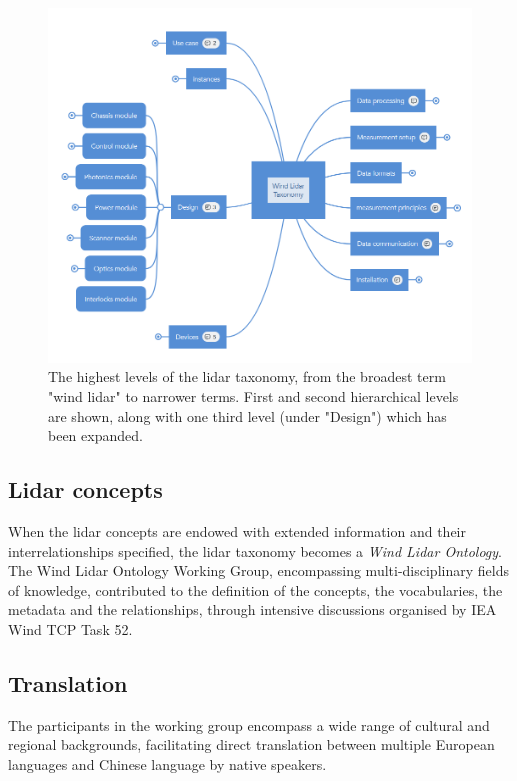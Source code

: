\documentclass[remotesensing,article,submit,pdftex,moreauthors]{Definitions/mdpi}
\begin{document}
\begin{figure}[ht]
    \centering
    \includegraphics[width=\textwidth]{Figures/MindMap.PNG}
    \caption{The highest levels of the lidar taxonomy, from the broadest term "wind lidar" to narrower terms. First and second hierarchical levels are shown, along with one third level (under "Design") which has been expanded.}
    \label{fig:tax}
\end{figure}

\subsection{Lidar concepts}
When the lidar concepts are endowed with extended information and their interrelationships specified, the lidar taxonomy becomes a {\it Wind Lidar Ontology}. The Wind Lidar Ontology Working Group, encompassing multi-disciplinary fields of knowledge,
contributed to the definition of the concepts, the vocabularies, the metadata and the relationships, through intensive
discussions organised by IEA Wind TCP Task 52.

\subsection{Translation}
The participants in the working group encompass a wide range of cultural and regional backgrounds,
facilitating direct translation between multiple European languages and Chinese language by native speakers.
\end{document}
